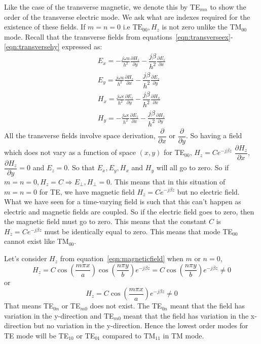 Like the case of the transverse magnetic, we denote this by TE$_{mn}$ to show the order of the transverse electric mode. We ask what are indexes required for the existence of these fields. If $m = n = 0$ i.e $\text{TE}_{00},H_z$ is not zero unlike the TM$_{00}$ mode. Recall that the transverse fields from equations~\ref{eqn:transverseex}-\ref{eqn:transversehy} expressed as:
\begin{align*}
E_x = -\frac{j\omega u}{h^2}\frac{\partial H_z}{\partial y} - \dfrac{j\beta}{h^2}\frac{\partial E_z}{\partial x}\\
E_y = \frac{j\omega u}{h^2}\frac{\partial H_z}{\partial x} - \dfrac{j\beta}{h^2}\frac{\partial E_z}{\partial y}\\
H_x = \frac{j\omega \epsilon}{h^2}\frac{\partial E_z}{\partial y} - \dfrac{j\beta}{h^2}\frac{\partial H_x}{\partial x}\\
H_y = -\frac{j\omega \epsilon}{h^2}\frac{\partial E_z}{\partial x} - \dfrac{j\beta}{h^2}\frac{\partial H_z}{\partial y}
\end{align*}
All the transverse fields involve space derivation, $\dfrac{\partial}{\partial x}$ or $\dfrac{\partial}{\partial y}$. So having a field which does not vary as a function of space $(x,y)$ for TE$_{00}$, $H_z = Ce^{-j\beta z}$  $\dfrac{\partial H_z}{\partial x}$,  $\dfrac{\partial H_z}{\partial y} = 0$ and $E_z = 0$. So that $E_x, E_y, H_x$ and $H_y$ will all go to zero. So if $m = n = 0, H_z = C \Rightarrow E_\bot , H_\bot = 0$. This means that in this situation of $m = n = 0$ for TE, we have magnetic field $H_z = Ce^{-j\beta z}$ but no electric field. What we have seen for a time-varying field is such that this can't happen as electric and magnetic fields are coupled. So if the electric field goes to zero, then the magnetic field must go to zero. This means that the constant $C$ is $H_z = Ce^{-j\beta z}$ must be identically equal to zero. This means that mode TE$_{00}$ cannot exist like TM$_{00}$.

Let's consider $H_z$ from equation~\ref{eqn:magneticfield} when $m$ or $n = 0$,
\begin{dmath*}
H_z = C \cos \left(\frac{m\pi x}{a}\right)\cos\left(\frac{n\pi y}{b}\right)e^{-j\beta z} = C \cos \left(\frac{n\pi y}{b}\right)e^{-j\beta z} \neq 0 
\end{dmath*}
or 
\begin{dmath*}
H_z = C \cos \left(\frac{m\pi x}{a}\right)e^{-j\beta z} \neq 0 
\end{dmath*}
That means TE$_{0n}$ or TE$_{m0}$ does not exist. The TE$_{0n}$ meant that the field has variation in the y-direction and TE$_{m0}$ meant that the field has variation in the x-direction but no variation in the y-direction. Hence the lowest order modes for TE mode will be TE$_{10}$ or TE$_{01}$ compared to TM$_{11}$ in TM mode. 

